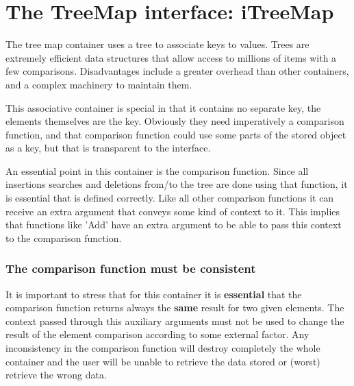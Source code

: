 \documentclass[12pt,a4paper]{memoir} %
\newcommand{\container}{}
\begin{document}
{{\section{The TreeMap interface: iTreeMap}
\renewcommand{\container}{TreeMap}
The tree map container uses a tree to associate  keys to values. Trees are extremely efficient data structures that allow access to millions
of items with a few comparisons. Disadvantages include a greater overhead than other containers, and a complex machinery to maintain
them.

This associative container is special in that it contains no separate key, the elements themselves are the key. Obviously they need imperatively 
a comparison function, and that comparison function could use some parts of the stored object as a key, but that is transparent to the interface.

An essential point in this container is the comparison function. Since all insertions searches and deletions from/to the tree are done using that
function, it is essential that is defined correctly. Like all other comparison functions it can receive an extra argument that conveys some kind
of context to it. This implies that functions like 'Add' have an extra argument to be able to pass this context to the comparison function.
\subsubsection{The comparison function must be consistent}
It is important to stress that for this container it is \textbf{essential} that the comparison function returns always the \textbf{same} result for
two given elements. The context passed through this auxiliary arguments must not be used to change the result of the element comparison according
to some external factor. Any inconsistency in the comparison function will destroy completely the whole container and the user will be unable
to retrieve the data stored or (worst) retrieve the wrong data.

}}
\end{document}
